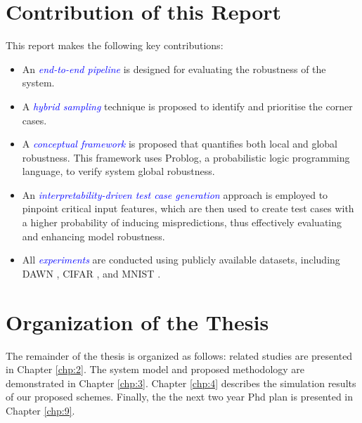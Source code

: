 \section{Contribution of this Report}


This report makes the following key contributions: %

\begin{itemize}
    \item An \textit{\textcolor{blue}{end-to-end pipeline}} is designed for evaluating the robustness of the system.
    \item A \textit{\textcolor{blue}{hybrid sampling}} technique is proposed to identify and prioritise the corner cases.
    \item A \textit{\textcolor{blue}{conceptual framework}} is proposed that quantifies both local and global robustness. This framework uses Problog, a probabilistic logic programming language, to verify system global robustness.
    \item An \textit{\textcolor{blue}{interpretability-driven test case generation}} approach is employed to pinpoint critical input features, which are then used to create test cases with a higher probability of inducing mispredictions, thus effectively evaluating and enhancing model robustness.
    \item All \textit{\textcolor{blue}{experiments}} are conducted using publicly available datasets, including DAWN \cite{DAWN}, CIFAR \cite{CIFAR10}, and MNIST \cite{MNIST}.
\end{itemize}

\begin{center}
    \end{center}
\section{Organization of the Thesis}\hypertarget{organization of thesis}{}
The remainder of the thesis is organized as follows: related studies are presented in Chapter \ref{chp:2}. The system model and proposed methodology are demonstrated in Chapter \ref{chp:3}. Chapter \ref{chp:4} describes the simulation results of our proposed schemes. Finally, the the next two year Phd plan is presented in Chapter \ref{chp:9}.


\clearpage
